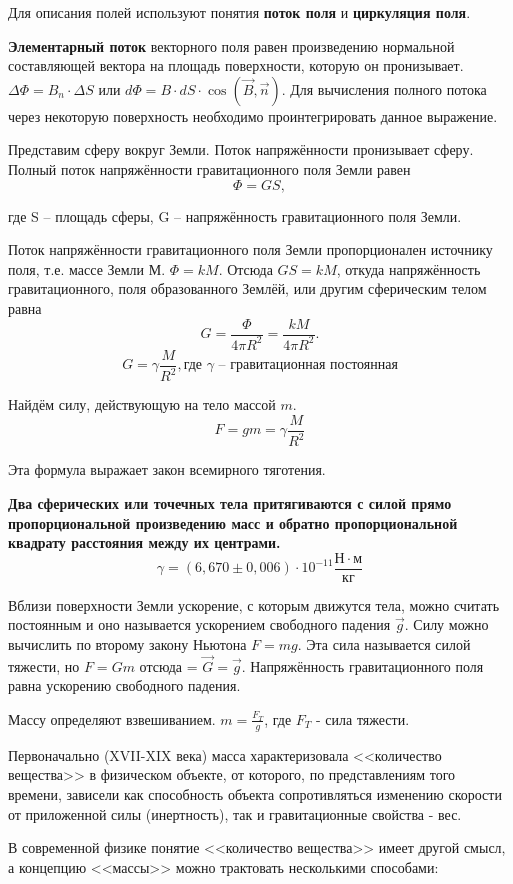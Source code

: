 \documentclass[a5paper, 10pt]{diss_4}
\renewcommand{\'}{\,'}
\begin{document}
  Для описания полей используют понятия \textbf{поток поля} и
\textbf{циркуляция поля}.

  \textbf{Элементарный поток} векторного поля равен произведению нормальной
составляющей вектора на площадь поверхности, которую он пронизывает.
$\Delta\Phi=B_n\cdot\Delta S$ или $d\Phi=B\cdot dS\cdot\cos(\vec{B},\vec{n})$.
Для вычисления полного потока через некоторую поверхность необходимо
проинтегрировать данное выражение.

  Представим сферу вокруг Земли. Поток напряжённости пронизывает сферу.
Полный поток напряжённости гравитационного поля Земли равен
\[
\Phi=GS,
\]

где S -- площадь сферы, G -- напряжённость гравитационного поля Земли.

  Поток напряжённости гравитационного поля Земли пропорционален источнику
поля, т.е. массе Земли $М$. $\Phi=kM$. Отсюда $GS = kM$, откуда напряжённость
гравитационного, поля образованного Землёй, или другим сферическим телом равна
\[
G=\frac{\Phi}{4\pi R^2}=\frac{kM}{4\pi R^2}.
\]
\[
G=\gamma\frac{M}{R^2},\text{где $\gamma$ -- гравитационная постоянная}
\]

 Найдём силу, действующую на тело массой $m$.
\[
F=gm=\gamma\frac{M}{R^2}
\]

 Эта формула выражает закон всемирного тяготения.

 \textbf{Два сферических или точечных тела притягиваются с силой прямо
пропорциональной произведению масс и обратно пропорциональной квадрату
расстояния между их центрами. }
\[
\gamma=(6,670\pm0,006)\cdot10^{-11}\frac{Н\cdot м}{кг}
\]

  Вблизи поверхности Земли ускорение, с которым движутся тела, можно считать
постоянным и оно называется ускорением свободного падения $\vec{g}$. Силу можно
 вычислить по второму закону Ньютона $F=mg$. Эта сила называется силой
тяжести, но $F=Gm$ отсюда = $\vec{G}=\vec{g}$. Напряжённость гравитационного поля равна
ускорению свободного падения.

  Массу определяют взвешиванием. $m=\frac{F_T}{g}$, где $F_T$ - сила тяжести.

 Первоначально (XVII-XIX века) масса характеризовала <<количество вещества>> в
физическом объекте, от которого, по представлениям того времени, зависели как
способность объекта сопротивляться изменению скорости от приложенной силы
(инертность), так и гравитационные свойства - вес.

 В современной физике понятие <<количество вещества>> имеет другой смысл, а
концепцию <<массы>> можно трактовать несколькими способами:
\end{document}
